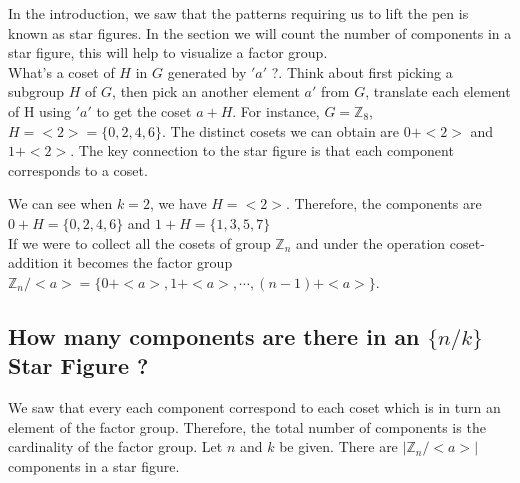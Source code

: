 \documentclass{article}
\begin{document}
In the introduction, we saw that the patterns requiring us to lift the pen is known as star figures. In the section we will count the number of components in a star figure, this will help to visualize a factor group.\\[2mm]
What's a coset of $H$ in $G$ generated by $'a'$ ?. Think about first picking a subgroup $H$ of $G$, then pick an another element $a'$ from $G$, translate each element of H using $'a'$ to get the coset $a + H$. For instance, $G = \mathbb{Z}_8$, $H = <2> = \{0,2,4,6\}$. The distinct cosets we can obtain are $0+<2>$ and $1+ <2>$. The key connection to the star figure is that each component corresponds to a coset. 
\begin{center}
\end{center}
We can see when $k = 2$, we have $H = <2>$. Therefore, the components are $0+ H =\{0,2,4,6\}$ and $1 + H = \{1,3,5,7\}$\\[2mm]
If we were to collect all the cosets of group $\mathbb{Z}_n$ and under the operation coset-addition it becomes the factor group $\mathbb{Z}_n/<a> = \{0 + <a>, 1 + <a>, \cdots , (n-1) + <a>\}$. 

\subsection{How many components are there in an $\{n/k\}$ Star Figure ?}
We saw that every each component correspond to each coset which is in turn an element of the factor group. Therefore, the total number of components is the cardinality of the factor group. Let $n$ and $k$ be given. There are $|\mathbb{Z}_n/<a>|$ components in a star figure.
\end{document}
